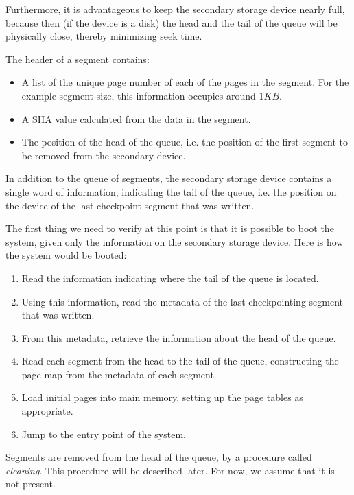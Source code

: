 Furthermore, it is advantageous to keep the secondary storage device
nearly full, because then (if the device is a disk) the head and the
tail of the queue will be physically close, thereby minimizing seek
time.

The header of a segment contains:

\begin{itemize}
\item A list of the unique page number of each of the pages in the
  segment.  For the example segment size, this information occupies
  around $1KB$.
\item A SHA value calculated from the data in the segment.
\item The position of the head of the queue, i.e. the position of the
  first segment to be removed from the secondary device.
\end{itemize}

In addition to the queue of segments, the secondary storage device
contains a single word of information, indicating the tail of the
queue, i.e. the position on the device of the last checkpoint segment
that was written.

The first thing we need to verify at this point is that it is possible
to boot the system, given only the information on the secondary
storage device.  Here is how the system would be booted:

\begin{enumerate}
\item Read the information indicating where the tail of the queue is
  located.
\item Using this information, read the metadata of the last
  checkpointing segment that was written.
\item From this metadata, retrieve the information about the head of
  the queue.
\item Read each segment from the head to the tail of the queue,
  constructing the page map from the metadata of each segment.
\item Load initial pages into main memory, setting up the page tables
  as appropriate.
\item Jump to the entry point of the system.
\end{enumerate}

Segments are removed from the head of the queue, by a procedure called
\emph{cleaning}.  This procedure will be described later.  For now, we
assume that it is not present.

